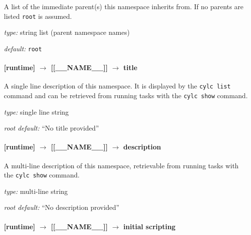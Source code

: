A list of the immediate parent(s) this namespace inherits from. If no
parents are listed \lstinline=root= is assumed.

\begin{myitemize}
\item {\em type:} string list (parent namespace names)
\item {\em default:} \lstinline=root=
\end{myitemize}

\paragraph[title]{[runtime] $\rightarrow$ [[\_\_NAME\_\_]] $\rightarrow$ title}

A single line description of this namespace. It is displayed by the
\lstinline=cylc list= command and can be retrieved from running tasks
with the \lstinline=cylc show= command.

\begin{myitemize}
\item {\em type:} single line string
\item {\em root default:} ``No title provided''
\end{myitemize}

\paragraph[description]{[runtime] $\rightarrow$ [[\_\_NAME\_\_]] $\rightarrow$ description}

A multi-line description of this namespace, retrievable from running tasks with the
\lstinline=cylc show= command.

\begin{myitemize}
\item {\em type:} multi-line string
\item {\em root default:} ``No description provided''
\end{myitemize}


\paragraph[initial scripting]{[runtime] $\rightarrow$ [[\_\_NAME\_\_]] $\rightarrow$ initial scripting}

